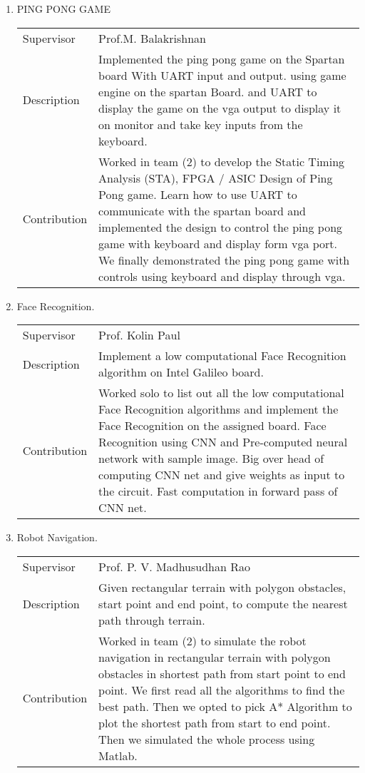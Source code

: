 \documentclass[letterpaper,11pt]{article}
\newlength{\outerbordwidth}
\newcommand{\resheading}[1]{\vspace{8pt}
  \parbox{\textwidth}{\setlength{\FrameSep}{\outerbordwidth}
    \begin{shaded}
\setlength{\fboxsep}{0pt}\framebox[\textwidth][l]{\setlength{\fboxsep}{4pt}\fcolorbox{shadecolorB}{shadecolorB}{\textbf{\sffamily{\mbox{~}\makebox[6.762in][l]{\large #1} \vphantom{p\^{E}}}}}}
    \end{shaded}
  }\vspace{-5pt}
}
\begin{document}
\newpage
\resheading{PROJECTS}

\begin{enumerate}
 \item PING PONG GAME\\
 \begin{center}
 \begin{tabular}{p{3cm} p{13cm} }
 Supervisor& Prof.M. Balakrishnan  \\
 Description& Implemented the ping pong game on the Spartan board With UART input and output. using game engine on the spartan Board. and UART to display the game on the vga output to display it on monitor and take key inputs from the keyboard. \\
Contribution& Worked in team (2) to develop the Static Timing Analysis (STA), FPGA / ASIC Design of Ping Pong game. Learn how to use UART to communicate with the spartan board and implemented the design to control the ping pong game
with keyboard and display form vga port. We finally demonstrated the ping pong game with controls using keyboard
and display through vga.
\end{tabular}
\end{center}

 \item Face Recognition.
 \begin{center}
 \begin{tabular}{p{3cm} p{13cm} }
 Supervisor& Prof. Kolin Paul\\
 Description& Implement a low computational Face Recognition algorithm on Intel Galileo board.\\
Contribution& Worked solo to list out all the low computational Face Recognition algorithms and implement the Face Recognition on the assigned board. Face Recognition using CNN and Pre-computed neural network with sample image. Big over
head of computing CNN net and give weights as input to the circuit. Fast computation in forward pass of CNN net.\\
\end{tabular}
\end{center}

\item Robot Navigation.
 \begin{center}
 \begin{tabular}{p{3cm} p{13cm} }
 Supervisor& Prof. P. V. Madhusudhan Rao\\
 Description& Given rectangular terrain with polygon obstacles, start point and end point, to compute the nearest path through terrain.\\
Contribution&Worked in team (2) to simulate the robot navigation in rectangular terrain with polygon obstacles in shortest path from start point to end point. We first read all the algorithms to find the best path. Then we opted to pick A*
Algorithm to plot the shortest path from start to end point. Then we simulated the whole process using Matlab.\\
\end{tabular}
\end{center}


\end{enumerate}
\end{document}
